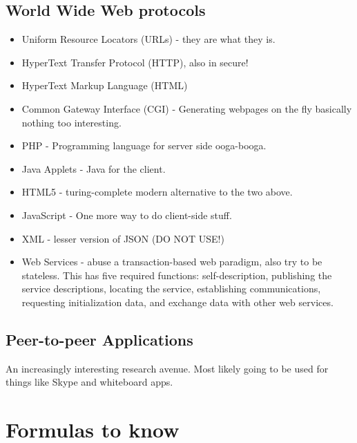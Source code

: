 \documentclass{scrartcl}
\begin{document}
\subsection*{World Wide Web protocols}
\begin{itemize}
\item Uniform Resource Locators (URLs) - they are what they is.
\item HyperText Transfer Protocol (HTTP), also in secure!
\item HyperText Markup Language (HTML)
\item Common Gateway Interface (CGI) - Generating webpages on the fly basically
nothing too interesting.
\item PHP - Programming language for server side ooga-booga.
\item Java Applets - Java for the client.
\item HTML5 - turing-complete modern alternative to the two above.
\item JavaScript - One more way to do client-side stuff.
\item XML - lesser version of JSON (DO NOT USE!)
\item Web Services - abuse a transaction-based web paradigm, also try to be
stateless. This has five required functions: self-description, publishing the
service descriptions, locating the service, establishing communications,
requesting initialization data, and exchange data with other web services.
\end{itemize}
\subsection*{Peer-to-peer Applications}
An increasingly interesting research avenue. Most likely going to be used for
things like Skype and whiteboard apps.
\section*{Formulas to know}
\end{document}
